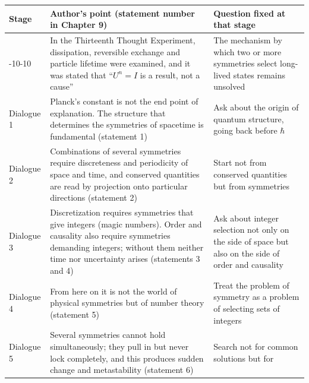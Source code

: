 \documentclass[
  a4paper,
]{article}
\newcounter{none} %
\begin{document}
{\def\LTcaptype{none} %
\begin{longtable}[]{@{}
  >{\raggedright\arraybackslash}p{}
  >{\raggedright\arraybackslash}p{}
  >{\raggedright\arraybackslash}p{}@{}}
\toprule\noalign{}
\begin{minipage}[b]{\linewidth}\raggedright
Stage
\end{minipage} & \begin{minipage}[b]{\linewidth}\raggedright
Author's point (statement number in Chapter 9)
\end{minipage} & \begin{minipage}[b]{\linewidth}\raggedright
Question fixed at that stage
\end{minipage} \\
\midrule\noalign{}
\endhead
\bottomrule\noalign{}
\endlastfoot
2026-10-10 & In the Thirteenth Thought Experiment, dissipation,
reversible exchange and particle lifetime were examined, and it was
stated that ``\(U^n=I\) is a result, not a cause'' & The mechanism by
which two or more symmetries select long-lived states remains
unsolved \\
Dialogue 1 & Planck's constant is not the end point of explanation. The
structure that determines the symmetries of spacetime is fundamental
(statement 1) & Ask about the origin of quantum structure, going back
before \(\hbar\) \\
Dialogue 2 & Combinations of several symmetries require discreteness and
periodicity of space and time, and conserved quantities are read by
projection onto particular directions (statement 2) & Start not from
conserved quantities but from symmetries \\
Dialogue 3 & Discretization requires symmetries that give integers
(magic numbers). Order and causality also require symmetries demanding
integers; without them neither time nor uncertainty arises (statements 3
and 4) & Ask about integer selection not only on the side of space but
also on the side of order and causality \\
Dialogue 4 & From here on it is not the world of physical symmetries but
of number theory (statement 5) & Treat the problem of symmetry as a
problem of selecting sets of integers \\
Dialogue 5 & Several symmetries cannot hold simultaneously; they pull in
but never lock completely, and this produces sudden change and
metastability (statement 6) & Search not for common solutions but for

\end{longtable}}
\end{document}
